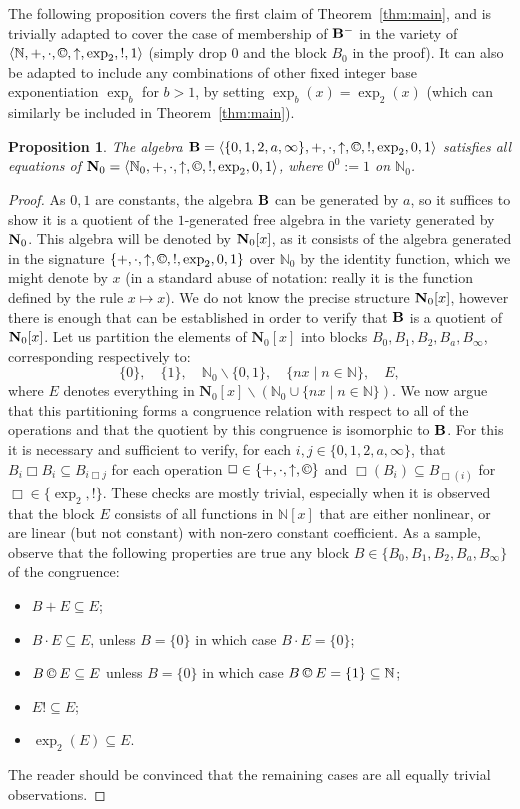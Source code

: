\documentclass[eqnor,reqno]{amsart}
\theoremstyle{plain}
\newtheorem{pro}[thm]{Proposition}
\theoremstyle{definition}
\newcommand{\cc}{\mathbin{\textup{\copyright}}}
\begin{document}
The following proposition covers the first claim of Theorem~\ref{thm:main}, and is trivially adapted to cover the case of membership of ${\bf B}^-$ in the variety of $\langle\mathbb{N},+,\cdot,\cc,\uparrow,\exp_2,!,1\rangle$ (simply drop $0$ and the block $B_0$ in the proof).  It can also be adapted to include any combinations of other fixed integer base exponentiation $\exp_b$ for $b>1$, by setting $\exp_b(x)=\exp_2(x)$ (which can similarly be included in Theorem~\ref{thm:main}).
\begin{pro}\label{pro:in}
The algebra ${\bf B}=\langle \{0,1,2,a,\infty\},+,\cdot,\uparrow,\cc,!,\exp_2,0,1\rangle$ satisfies all equations of ${\bf N}_0=\langle\mathbb{N}_0,+,\cdot,\uparrow,\cc,!,\exp_2,0,1\rangle$, where $0^0:=1$ on $\mathbb{N}_0$.
\end{pro}
\begin{proof}
As $0,1$ are constants, the algebra ${\bf B}$ can be generated by $a$, so it suffices to show it is a quotient of the $1$-generated free algebra in the variety generated by~${\bf N}_0$.  
This algebra will be denoted by ${\bf N}_0[x]$, as it consists of the algebra generated in the signature $\{+,\cdot,\uparrow,\cc,!,\exp_2,0,1\}$ over $\mathbb{N}_0$ by the identity function, which we might denote by $x$ (in a standard abuse of notation: really it is the function defined by the rule $x\mapsto x$).  
We do not know the precise structure ${\bf N}_0[x]$, however there is enough that can be established in order to verify that ${\bf B}$ is a quotient of ${\bf N}_0[x]$.  
Let us partition the elements of $\mathbf{N}_0[x]$ into blocks $B_0,B_1,B_2,B_a,B_\infty$, corresponding respectively to: 
\[
\{0\},\quad \{1\}, \quad \mathbb{N}_0\backslash\{0,1\},\quad \{nx\mid n\in\mathbb{N}\},\quad E,
\]
where $E$ denotes everything in 
$\mathbf{N}_0[x]\backslash \left(\mathbb{N}_0\cup \{nx\mid n\in\mathbb{N}\}\right)$.  We now argue that this partitioning forms a congruence relation with respect to all of the operations and that the quotient by this congruence is isomorphic to ${\bf B}$.  For this it is necessary and sufficient to verify, for each $i,j\in\{0,1,2,a,\infty\}$, that $B_i\mathbin{\Box}B_i\subseteq B_{i\mathbin{\Box}j}$ for each operation $\Box\in\{+,\cdot,\uparrow,\cc\}$ and $\Box(B_i)\subseteq B_{\Box(i)}$ for $\Box\in \{\exp_2,!\}$.  These checks are mostly trivial, especially when it is observed that the block $E$  consists of all functions in $\mathbb{N}[x]$ that are either nonlinear, or are linear (but not constant) with non-zero constant coefficient.  As a sample, observe that the following properties are true any block $B\in \{B_0,B_1,B_2,B_a,B_\infty\}$ of the congruence: 
\begin{itemize}
\item $B+E\subseteq E$;
\item $B\cdot E\subseteq E$, unless $B=\{0\}$ in which case $B\cdot E= \{0\}$;
\item $B\cc E\subseteq E$ unless $B=\{0\}$ in which case $B\cc E=\{1\}\subseteq \mathbb{N}$;
\item $E!\subseteq E$;
\item $\exp_2(E)\subseteq E$.
\end{itemize}
The reader should be convinced that the remaining cases are all equally trivial observations.
\end{proof}
\end{document}
